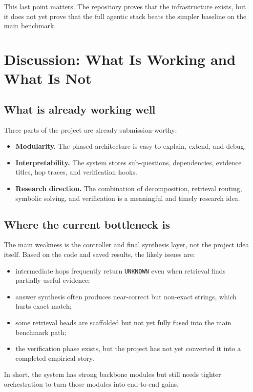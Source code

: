 \documentclass[11pt]{article}
\begin{document}
This last point matters. The repository proves that the infrastructure exists, but it does not yet prove that the full agentic stack beats the simpler baseline on the main benchmark.

\section{Discussion: What Is Working and What Is Not}
\subsection{What is already working well}
Three parts of the project are already submission-worthy:

\begin{itemize}[leftmargin=1.2em]
\item \textbf{Modularity.} The phased architecture is easy to explain, extend, and debug.
\item \textbf{Interpretability.} The system stores sub-questions, dependencies, evidence titles, hop traces, and verification hooks.
\item \textbf{Research direction.} The combination of decomposition, retrieval routing, symbolic solving, and verification is a meaningful and timely research idea.
\end{itemize}

\subsection{Where the current bottleneck is}
The main weakness is the controller and final synthesis layer, not the project idea itself. Based on the code and saved results, the likely issues are:

\begin{itemize}[leftmargin=1.2em]
\item intermediate hops frequently return \texttt{UNKNOWN} even when retrieval finds partially useful evidence;
\item answer synthesis often produces near-correct but non-exact strings, which hurts exact match;
\item some retrieval heads are scaffolded but not yet fully fused into the main benchmark path;
\item the verification phase exists, but the project has not yet converted it into a completed empirical story.
\end{itemize}

In short, the system has strong backbone modules but still needs tighter orchestration to turn those modules into end-to-end gains.
\end{document}
